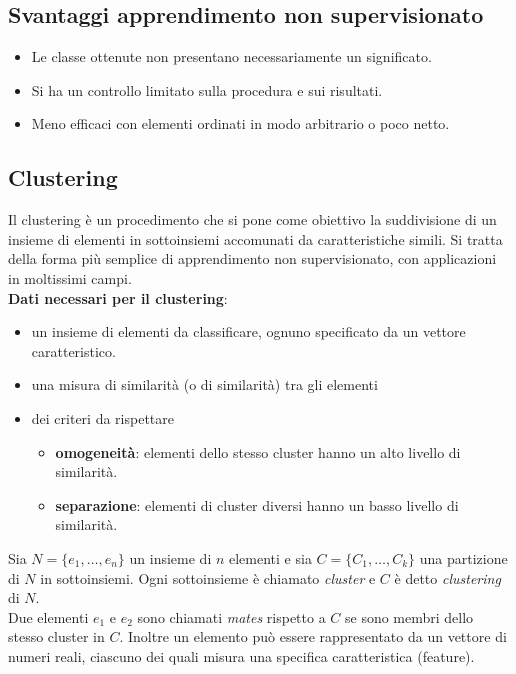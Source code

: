 \subsection{Svantaggi apprendimento non supervisionato}
\begin{itemize}
    \item  Le classe ottenute non presentano necessariamente un significato.
    \item  Si ha un controllo limitato sulla procedura e sui risultati. 
    \item  Meno efficaci con elementi ordinati in modo arbitrario o poco netto.
\end{itemize}
\subsection{Clustering}
Il clustering è un procedimento che si pone come obiettivo la suddivisione di un insieme di elementi in sottoinsiemi accomunati da caratteristiche simili.
Si tratta della forma più semplice di apprendimento non supervisionato, con applicazioni in moltissimi campi.\\

\textbf{Dati necessari per il clustering}: 
\begin{itemize}
    \item  un insieme di elementi da classificare, ognuno specificato da un vettore caratteristico.
    \item  una misura di similarità (o di similarità) tra gli elementi
    \item  dei criteri da rispettare
        \begin{itemize}
            \item  \textbf{omogeneità}: elementi dello stesso cluster hanno un alto livello di similarità.
            \item  \textbf{separazione}: elementi di cluster diversi hanno un basso livello di similarità.
        \end{itemize}
\end{itemize}
Sia $N = \{e_1, \dots, e_n\}$ un insieme di $n$ elementi e sia $C = \{C_1, \dots, C_k\}$ una partizione di $N$ in sottoinsiemi. Ogni sottoinsieme è chiamato \textit{cluster} e $C$ è detto \textit{clustering} di $N$. \\
Due elementi $e_1$ e $e_2$ sono chiamati \textit{mates} rispetto a $C$ se sono membri dello stesso cluster in $C$. Inoltre un elemento può essere rappresentato da un vettore di numeri reali, ciascuno dei quali misura una specifica caratteristica (feature).


